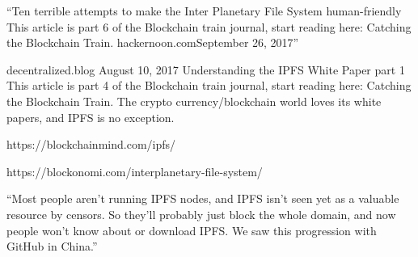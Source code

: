 ``Ten terrible attempts to make the Inter Planetary File System human-friendly
This article is part 6 of the Blockchain train journal, start reading
here: Catching the Blockchain Train.
hackernoon.comSeptember 26, 2017''

decentralized.blog August 10, 2017
Understanding the IPFS White Paper part 1
This article is part 4 of the Blockchain train journal, start reading
here: Catching the Blockchain Train. The crypto currency/blockchain
world loves its white papers, and IPFS is no exception.

https://blockchainmind.com/ipfs/

https://blockonomi.com/interplanetary-file-system/

``Most people aren't running IPFS nodes, and IPFS isn't seen yet as a
valuable resource by censors. So they'll probably just block the whole
domain, and now people won't know about or download IPFS. We saw this
progression with GitHub in China.''

